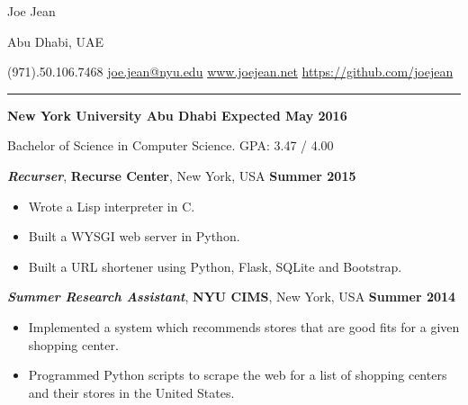 \documentclass[11pt]{article} %
\begin{document}
\centerline{{\Huge \sc Joe Jean}}  %
\centerline{Abu Dhabi, UAE}
\centerline{(971).50.106.7468 \textbar \hspace{2pt}\href{mailto:joe.jean@nyu.edu}{joe.jean@nyu.edu} \textbar \hspace{2pt}\url{www.joejean.net} \textbar \hspace{2pt}\url{https://github.com/joejean} } 
\noindent
\rule{\textwidth}{1pt}\bigskip

\medskip

\noindent \centerline{\normalsize \bf New York University Abu Dhabi \hfill \textbf{Expected May 2016} }
Bachelor of Science in Computer Science. GPA: 3.47 / 4.00\\

 \medskip

\noindent \centerline{\large \textbf{\textit{Recurser}}, \textbf {Recurse Center}, New York, USA \hfill \textbf{Summer 2015}}
\begin{itemize}\itemsep-0.2em
  \item Wrote a Lisp interpreter in C. 
  \item Built a WYSGI web server in Python.
  \item Built a URL shortener using Python, Flask, SQLite and Bootstrap.
\end{itemize}
\noindent \centerline{\large \textbf{\textit{Summer Research Assistant}}, \textbf {NYU CIMS}, New York, USA \hfill \textbf{Summer 2014}}
\begin{itemize}\itemsep-0.2em
  \item Implemented a system which recommends stores that are good fits for a given shopping center.
  \item Programmed Python scripts to scrape the web for a list of shopping centers and their stores in the United States.
\end{itemize}
\medskip

\vspace{0.05in}
\end{document}
